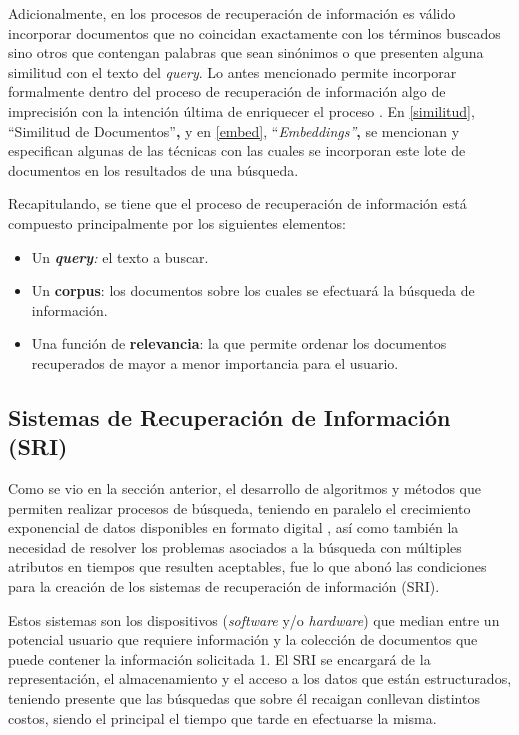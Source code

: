 \documentclass[
  12pt,
  openany]{book}
\begin{document}
Adicionalmente, en los procesos de recuperación de información es válido incorporar documentos que no coincidan exactamente con los términos buscados sino otros que contengan palabras que sean sinónimos o que presenten alguna similitud con el texto del \emph{query}. Lo antes mencionado permite incorporar formalmente dentro del proceso de recuperación de información algo de imprecisión con la intención última de enriquecer el proceso \citep{kraft2017}. En \ref{similitud}, ``Similitud de Documentos''\textbf{,} y en \ref{embed}, ``\emph{Embeddings''}\textbf{,} se mencionan y especifican algunas de las técnicas con las cuales se incorporan este lote de documentos en los resultados de una búsqueda.

Recapitulando, se tiene que el proceso de recuperación de información está compuesto principalmente por los siguientes elementos:

\begin{itemize}
\item
  Un \emph{\textbf{query}:} el texto a buscar.
\item
  Un \textbf{corpus}: los documentos sobre los cuales se efectuará la búsqueda de información.
\item
  Una función de \textbf{relevancia}: la que permite ordenar los documentos recuperados de mayor a menor importancia para el usuario.
\end{itemize}

\hypertarget{SRI}{%
\subsection{Sistemas de Recuperación de Información (SRI)}\label{SRI}}

Como se vio en la sección anterior, el desarrollo de algoritmos y métodos que permiten realizar procesos de búsqueda, teniendo en paralelo el crecimiento exponencial de datos disponibles en formato digital \citep{worldde2016}, así como también la necesidad de resolver los problemas asociados a la búsqueda con múltiples atributos en tiempos que resulten aceptables, fue lo que abonó las condiciones para la creación de los sistemas de recuperación de información (SRI).

Estos sistemas son los dispositivos (\emph{software} y/o \emph{hardware}) que median entre un potencial usuario que requiere información y la colección de documentos que puede contener la información solicitada \citep{kraft2017} 1. El SRI se encargará de la representación, el almacenamiento y el acceso a los datos que están estructurados, teniendo presente que las búsquedas que sobre él recaigan conllevan distintos costos, siendo el principal el tiempo que tarde en efectuarse la misma.
\end{document}
